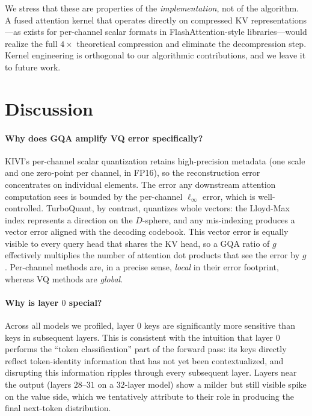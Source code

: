 \documentclass[11pt]{article}
\begin{document}
We stress that these are properties of the \emph{implementation}, not of the algorithm. A fused attention kernel that operates directly on compressed KV representations---as exists for per-channel scalar formats in FlashAttention-style libraries---would realize the full $4\times$ theoretical compression and eliminate the decompression step. Kernel engineering is orthogonal to our algorithmic contributions, and we leave it to future work.

\section{Discussion}
\label{sec:discussion}

\paragraph{Why does GQA amplify VQ error specifically?}
KIVI's per-channel scalar quantization retains high-precision metadata (one scale and one zero-point per channel, in FP16), so the reconstruction error concentrates on individual elements. The error any downstream attention computation sees is bounded by the per-channel $\ell_\infty$ error, which is well-controlled. TurboQuant, by contrast, quantizes whole vectors: the Lloyd-Max index represents a direction on the $D$-sphere, and any mis-indexing produces a vector error aligned with the decoding codebook. This vector error is equally visible to every query head that shares the KV head, so a GQA ratio of $g$ effectively multiplies the number of attention dot products that see the error by $g$. Per-channel methods are, in a precise sense, \emph{local} in their error footprint, whereas VQ methods are \emph{global}.

\paragraph{Why is layer $0$ special?}
Across all models we profiled, layer $0$ keys are significantly more sensitive than keys in subsequent layers. This is consistent with the intuition that layer $0$ performs the ``token classification'' part of the forward pass: its keys directly reflect token-identity information that has not yet been contextualized, and disrupting this information ripples through every subsequent layer. Layers near the output (layers $28$--$31$ on a $32$-layer model) show a milder but still visible spike on the value side, which we tentatively attribute to their role in producing the final next-token distribution.
\end{document}
